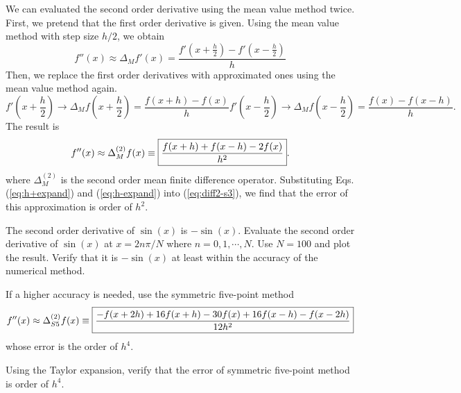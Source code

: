 We can evaluated the second order derivative using the mean value method twice.
First, we pretend that the first order derivative is given. Using the mean value method with step size $h/2$, we obtain
\begin{equation}
f''(x) \approx \Delta_M f'(x) = \frac{f'(x+\frac{h}{2})-f'(x-\frac{h}{2})}{h}
\end{equation}
Then, we replace the first order derivatives with approximated ones using the mean value method again.
\begin{subequations}
\begin{equation}
f'(x+\frac{h}{2}) \rightarrow \Delta_M f(x+\frac{h}{2}) = \frac{f(x+h)-f(x)}{h}
\end{equation}
\begin{equation}
f'(x-\frac{h}{2}) \rightarrow \Delta_M f(x-\frac{h}{2}) = \frac{f(x)-f(x-h)}{h}.
\end{equation}
\end{subequations}
The result is
\begin{equation}\label{eq:diff2-s3}
f''(x) \approx \Delta^{(2)}_M f(x) \equiv \fbox{$\displaystyle\frac{f(x+h)+f(x-h)-2f(x)}{h^2}$}.
\end{equation}
where $\Delta^{(2)}_M$ is the second order mean finite difference operator.
Substituting Eqs. (\ref{eq:h+expand}) and (\ref{eq:h-expand}) into (\ref{eq:diff2-s3}), we find that the error of this approximation is order of $h^2$.  

\vspace{18px}
\noindent
\exercise
The second order derivative of $\sin(x)$ is $-\sin(x)$.  Evaluate the second order derivative of $\sin(x)$ at $x=2 n \pi / N$ where $n=0, 1, \cdots, N$.  Use $N=100$ and plot the result. Verify that it is $-\sin(x)$ at least within the accuracy of the numerical method.

\vspace{18px}

If a higher accuracy is needed, use the symmetric five-point method
\begin{equation}\label{eq:diff2-s5}
f''(x) \approx \Delta^{(2)}_{S5} f(x) \equiv \fbox{$\displaystyle\frac{-f(x+2h) + 16 f(x+h) - 30 f(x) + 16 f(x-h) - f(x-2 h)}{12 h^2}$}
\end{equation}
whose error is the order of $h^4$.\cite{diff2}

\vspace{18px}
\noindent
\exercise
Using the Taylor expansion, verify that the error of symmetric five-point method is order of $h^4$.

